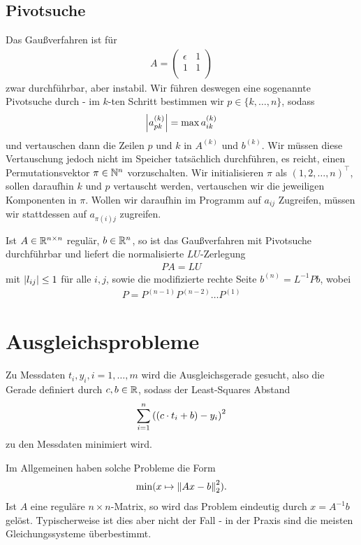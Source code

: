 \documentclass{report}
\begin{document}
\section{Pivotsuche}
	Das Gaußverfahren ist für 
	\begin{align*}
	 	A = \begin{pmatrix}
	 		\epsilon & 1\\
	 		1 & 1\\
	 	\end{pmatrix}
	\end{align*}
	zwar durchführbar, aber instabil. Wir führen deswegen eine sogenannte Pivotsuche durch - im $k$-ten Schritt bestimmen wir $p \in \{k, \hdots, n\}$, sodass
	\begin{align*}
	 	\abs{a_{pk}^{(k)}} = \max a_{ik}^{(k)}
	\end{align*}
	und vertauschen dann die Zeilen $p$ und $k$ in $A^{(k)}$ und $b^{(k)}$. Wir müssen diese Vertauschung jedoch nicht im Speicher tatsächlich durchführen, es reicht, einen Permutationsvektor $\pi \in \mathbb{N}^n$ vorzuschalten. Wir initialisieren $\pi$ als $(1,2,\hdots,n)^\top$, sollen daraufhin $k$ und $p$ vertauscht werden, vertauschen wir die jeweiligen Komponenten in $\pi$. Wollen wir daraufhin im Programm auf $a_{ij}$ Zugreifen, müssen wir stattdessen auf $a_{\pi(i) j}$ zugreifen.
	\begin{theorem}
		Ist $A \in \mathbb{R}^{n \times n}$ regulär, $b \in \mathbb{R}^n$, so ist das Gaußverfahren mit Pivotsuche durchführbar und liefert die normalisierte $LU$-Zerlegung 
		\begin{align*}
			PA = LU
		\end{align*}
		mit
		$\abs{l_{ij}} \leq 1$
		für alle $i,j$, sowie die modifizierte rechte Seite $b^{(n)} = L^{-1}Pb$, wobei 
		\begin{align*}
			P = P^{(n-1)} P^{(n-2)} \hdots P^{(1)}
		\end{align*}
	\end{theorem}




\chapter{Ausgleichsprobleme}
\begin{example}
	Zu Messdaten $t_i, y_i, i = 1, \hdots, m$ wird die Ausgleichsgerade gesucht, also die Gerade definiert durch $c,b \in \mathbb{R}$, sodass der Least-Squares Abstand
	\begin{align*}
		\sum_{i = 1}^n \qty((c \cdot t_i + b) - y_i)^2
	\end{align*}
	zu den Messdaten minimiert wird.
\end{example}
\noindent Im Allgemeinen haben solche Probleme die Form
\begin{align*}
	\min (x \mapsto \norm{Ax - b}_2^2).
\end{align*}
Ist $A$ eine reguläre $n \times n$-Matrix, so wird das Problem eindeutig durch $x = A^{-1}b$ gelöst. Typischerweise ist dies aber nicht der Fall - in der Praxis sind die meisten Gleichungssysteme überbestimmt.
\end{document}
